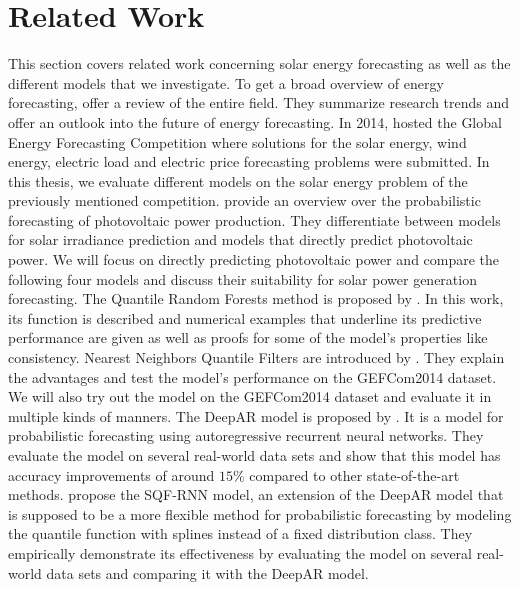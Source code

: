 \section{Related Work}
\label{sec:related-work}

This section covers related work concerning solar energy forecasting as well as 
the different models that we investigate. 
To get a broad overview of energy forecasting, 
\Textcite{Hong2020} offer a review of the entire field. 
They summarize research trends and offer an outlook into the future of energy forecasting. 
In 2014, \Textcite{Hong2016} hosted the Global Energy Forecasting Competition where 
solutions for the solar energy, wind energy, electric load and electric price forecasting 
problems were submitted. 
In this thesis, we evaluate different models on the solar energy problem 
of the previously mentioned competition. 
\Textcite{Meer2018} provide an overview over the probabilistic 
forecasting of photovoltaic power production. They differentiate between models for 
solar irradiance prediction and models that directly predict photovoltaic power. 
We will focus on directly predicting photovoltaic power 
and compare the following four models 
and discuss their suitability for solar power generation forecasting. 
The Quantile Random Forests method is proposed by \Textcite{Meinshausen2006}. 
In this work, its function is described 
and numerical examples that underline its predictive performance are given 
as well as proofs for some of the model's properties like consistency. 
Nearest Neighbors Quantile Filters are introduced by \Textcite{Ordiano2019}. 
They explain the advantages and test the model's performance on the GEFCom2014 dataset. 
We will also try out the model on the GEFCom2014 dataset and evaluate 
it in multiple kinds of manners.
The DeepAR model is proposed by \Textcite{Salinas2017}. 
It is a model for probabilistic forecasting using autoregressive recurrent neural networks. 
They evaluate the model on several 
real-world data sets and show that this model has accuracy improvements of around 
\(15\%\) compared to other state-of-the-art methods. 
\Textcite{Gasthaus2019} propose the SQF-RNN model, an extension of the DeepAR model 
that is supposed to be a more flexible method for probabilistic forecasting 
by modeling the quantile function with splines instead of a fixed distribution class.
They empirically demonstrate its effectiveness by evaluating the model on several real-world 
data sets and comparing it with the DeepAR model.